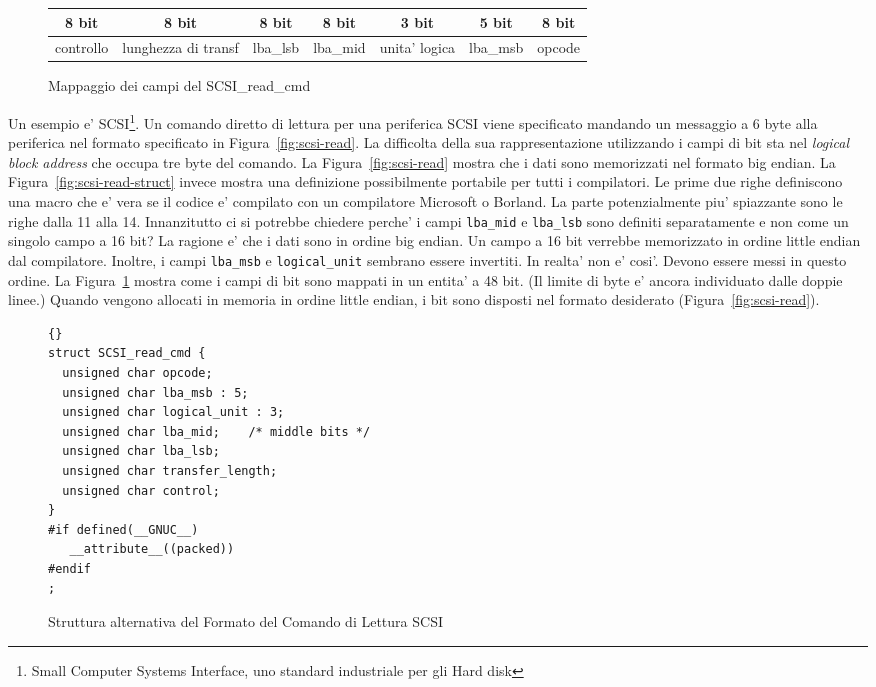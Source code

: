 \begin{figure}[t]
\centering
\begin{tabular}{|c||c||c||c||c|c||c|}
\multicolumn{1}{c}{8 bit} & \multicolumn{1}{c}{8 bit} 
& \multicolumn{1}{c}{8 bit} & \multicolumn{1}{c}{8 bit} 
& \multicolumn{1}{c}{3 bit} & \multicolumn{1}{c}{5 bit} 
& \multicolumn{1}{c}{8 bit} \\ \hline
controllo & lunghezza di transf & lba\_lsb  & lba\_mid &  
unita' logica  & lba\_msb & opcode \\
\hline
\end{tabular}
\caption{Mappaggio dei campi del {\code SCSI\_read\_cmd} \label{fig:scsi-read-map}}
\end{figure}
Un esempio e' SCSI\footnote{Small Computer Systems Interface, uno standard industriale
per gli Hard disk}. Un comando diretto di lettura per una periferica SCSI viene
specificato mandando un messaggio a 6 byte alla periferica nel formato 
specificato in Figura~\ref{fig:scsi-read}. La difficolta della sua rappresentazione
utilizzando i campi di bit sta nel \emph{logical block address} che occupa tre 
byte del comando. La Figura~\ref{fig:scsi-read} mostra che i dati sono memorizzati
nel formato big endian. La Figura~\ref{fig:scsi-read-struct} invece mostra una
definizione possibilmente portabile per tutti i compilatori. Le prime due righe
definiscono una macro che e' vera se il codice e' compilato con un compilatore
Microsoft o Borland. La parte potenzialmente piu' spiazzante sono le righe dalla
11 alla 14. Innanzitutto ci si potrebbe chiedere perche' i campi \lstinline|lba_mid| e
\lstinline|lba_lsb| sono definiti separatamente e non come un singolo campo a 16 bit?
La ragione e' che i dati sono in ordine big endian. Un campo a 16 bit verrebbe
memorizzato in ordine little endian dal compilatore. Inoltre, i campi \lstinline|lba_msb| e \lstinline|logical_unit| sembrano essere invertiti. In realta' non e' cosi'. Devono
essere messi in questo ordine. La Figura~\ref{fig:scsi-read-map} mostra come i 
campi di bit sono mappati in un entita' a 48 bit. (Il limite di byte e' ancora 
individuato dalle doppie linee.) Quando vengono allocati in memoria in ordine
little endian, i bit sono disposti nel formato desiderato (Figura~\ref{fig:scsi-read}). 

\begin{figure}[t]
\begin{lstlisting}[frame=lrtb]{}
struct SCSI_read_cmd {
  unsigned char opcode;
  unsigned char lba_msb : 5;
  unsigned char logical_unit : 3;
  unsigned char lba_mid;    /* middle bits */
  unsigned char lba_lsb;
  unsigned char transfer_length;
  unsigned char control;
}
#if defined(__GNUC__)
   __attribute__((packed))
#endif
;
\end{lstlisting}
\caption{Struttura alternativa del Formato del Comando di Lettura SCSI\label{fig:scsi-read-struct2}
         }
\end{figure}

